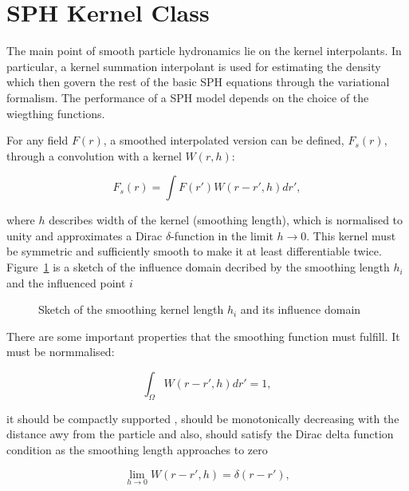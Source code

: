 \section{SPH Kernel Class}
\label{sec:section 5}

The main point of smooth particle hydronamics lie on the kernel interpolants. In particular, a kernel summation interpolant is used for estimating the density
which then govern the rest of the basic SPH equations through the variational formalism. The performance of a SPH model depends on the choice of the wiegthing functions. \par
For any field $F(r)$, a smoothed interpolated version can be defined, $F_{s}(r)$, through a convolution with a kernel $W(r,h)$:

\begin{equation}
 F_{s}(r) = \int F(r') W(r-r',h)dr' ,
\end{equation}

where $h$ describes width of the kernel (smoothing length), which is normalised to unity and approximates a Dirac $\delta$-function in the limit $h\rightarrow 0$. This kernel must be symmetric
and sufficiently smooth to make it at least differentiable twice. Figure~\ref{fig:Bild3.9} is a sketch of the influence domain decribed by the smoothing length $h_{i}$ and the influenced
point $i$


\begin{figure}[H]
\centering
  \begin{footnotesize}
  
  \caption[Sketch of the smoothing kernel length $h_{i}$ and its influence domainSketch of the smoothing kernel length $h_{i}$ and its influence domain]{Sketch of the smoothing kernel length $h_{i}$ and its influence domain}
  \label{fig:Bild3.9}
  \end{footnotesize}
\end{figure} 

There are some important properties that the smoothing function must fulfill. It must be normmalised:

\begin{equation}
 \int_{\Omega}W(r-r',h)dr'= 1 ,
\end{equation}

it should be compactly supported , should be monotonically decreasing with the distance awy from the particle and also, should satisfy the Dirac delta function condition as the smoothing
length approaches to zero 

\begin{equation}
 \lim_{h\to 0} W(r-r',h)= \delta(r-r') ,
\end{equation}

